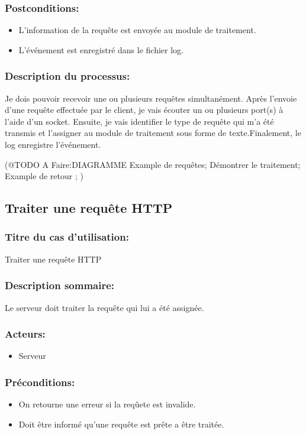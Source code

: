 \documentclass{scrreprt}
\begin{document}
\subsubsection{Postconditions:}
\begin{itemize}
    \item  L'information de la requête est envoyée au module de traitement.
    \item  L'événement est enregistré dans le fichier log.
\end{itemize} 
\subsubsection{Description du processus:}
Je dois pouvoir recevoir une ou plusieurs requêtes simultanément. Après l'envoie d'une requête effectuée par le client, je vais écouter un ou plusieurs port(s) à l'aide d'un socket. Ensuite, je vais identifier le type de requête qui m'a été transmis et l'assigner au module de traitement sous forme de texte.Finalement, le log enregistre l'événement.


(@TODO A Faire:DIAGRAMME
Example de requêtes;
Démontrer le traitement;
Example de retour ;
)


\subsection{Traiter une requête HTTP}
\subsubsection{Titre du cas d'utilisation:} Traiter une requête HTTP
\subsubsection{Description sommaire:} Le serveur doit traiter la requête qui lui a été assignée.
\subsubsection{Acteurs:}
\begin{itemize}
    \item Serveur
\end{itemize}
\subsubsection{Préconditions:}
\begin{itemize}
    \item On retourne une erreur si la reqûete est invalide.
    \item Doit être informé qu'une requête est prête a être traitée.  
\end{itemize} 
\end{document}
